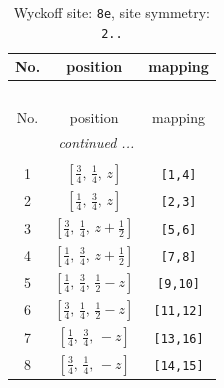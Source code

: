 \documentclass[fleqn,8pt]{jsarticle}
\begin{document}
\renewcommand{\arraystretch}{1.2}
\begin{longtable}{ccc}
\caption{Wyckoff site: {\tt 8e}, site symmetry: {\tt 2..}}
 \\
 \hline \hline
No. & position & mapping \\ \hline \endfirsthead

\multicolumn{2}{l}{\tablename\ \thetable{}} \\
 \hline \hline
No. & position & mapping \\ \hline \endhead

 \hline \hline
\multicolumn{2}{r}{\footnotesize\it continued ...} \\ \endfoot

 \hline \hline
\multicolumn{2}{r}{} \\ \endlastfoot

1 & $\left[ \frac{3}{4},\, \frac{1}{4},\, z \right]$ & {\tt [1,4]} \\ \hline
2 & $\left[ \frac{1}{4},\, \frac{3}{4},\, z \right]$ & {\tt [2,3]} \\ \hline
3 & $\left[ \frac{3}{4},\, \frac{1}{4},\, z + \frac{1}{2} \right]$ & {\tt [5,6]} \\ \hline
4 & $\left[ \frac{1}{4},\, \frac{3}{4},\, z + \frac{1}{2} \right]$ & {\tt [7,8]} \\ \hline
5 & $\left[ \frac{1}{4},\, \frac{3}{4},\, \frac{1}{2} - z \right]$ & {\tt [9,10]} \\ \hline
6 & $\left[ \frac{3}{4},\, \frac{1}{4},\, \frac{1}{2} - z \right]$ & {\tt [11,12]} \\ \hline
7 & $\left[ \frac{1}{4},\, \frac{3}{4},\, - z \right]$ & {\tt [13,16]} \\ \hline
8 & $\left[ \frac{3}{4},\, \frac{1}{4},\, - z \right]$ & {\tt [14,15]} \\
\end{longtable}
\renewcommand{\arraystretch}{1.2}
\end{document}
